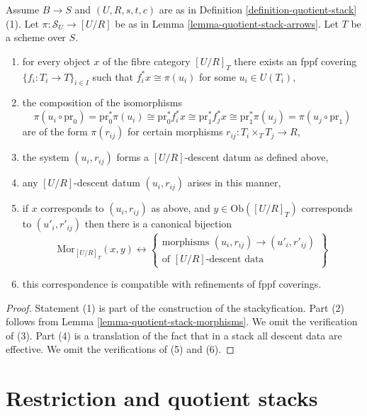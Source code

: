 \begin{lemma}
\label{lemma-quotient-stack-objects}
Assume $B \to S$ and $(U, R, s, t, c)$ are as in
Definition \ref{definition-quotient-stack} (1).
Let $\pi : \mathcal{S}_U \to [U/R]$ be as in
Lemma \ref{lemma-quotient-stack-arrows}.
Let $T$ be a scheme over $S$.
\begin{enumerate}
\item for every object $x$ of the fibre category $[U/R]_T$
there exists an fppf covering $\{f_i : T_i \to T\}_{i \in I}$ such that
$f_i^*x \cong \pi(u_i)$ for some $u_i \in U(T_i)$,
\item the composition of the isomorphisms
$$
\pi(u_i \circ \text{pr}_0)
=
\text{pr}_0^*\pi(u_i)
\cong
\text{pr}_0^*f_i^*x
\cong
\text{pr}_1^*f_j^*x
\cong
\text{pr}_1^*\pi(u_j)
=
\pi(u_j \circ \text{pr}_1)
$$
are of the form $\pi(r_{ij})$ for certain morphisms
$r_{ij} : T_i \times_T T_j \to R$,
\item the system $(u_i, r_{ij})$ forms
a $[U/R]$-descent datum as defined above,
\item any $[U/R]$-descent datum $(u_i, r_{ij})$ arises in this manner,
\item if $x$ corresponds to $(u_i, r_{ij})$ as above, and
$y \in \text{Ob}([U/R]_T)$ corresponds to $(u'_i, r'_{ij})$
then there is a canonical bijection
$$
\text{Mor}_{[U/R]_T}(x, y)
\longleftrightarrow
\left\{
\begin{matrix}
\text{morphisms }(u_i, r_{ij}) \to (u'_i, r'_{ij})\\
\text{of }[U/R]\text{-descent data}
\end{matrix}
\right\}
$$
\item this correspondence is compatible with refinements of fppf coverings.
\end{enumerate}
\end{lemma}

\begin{proof}
Statement (1) is part of the construction of the stackyfication.
Part (2) follows from
Lemma \ref{lemma-quotient-stack-morphisms}.
We omit the verification of (3).
Part (4) is a translation of the fact that in a stack all descent data
are effective.
We omit the verifications of (5) and (6).
\end{proof}








\section{Restriction and quotient stacks}
\label{section-quotient-stack-restrict}


